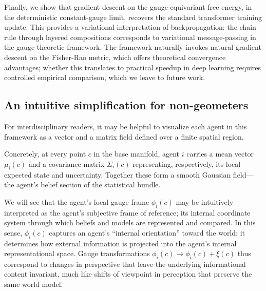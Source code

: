 \documentclass[twoside,11pt]{article}
\begin{document}
Finally, we show that gradient descent on the gauge-equivariant free energy, in the deterministic constant-gauge limit, recovers the standard transformer training update. This provides a variational interpretation of backpropagation: the chain rule through layered compositions corresponds to variational message-passing in the gauge-theoretic framework. The framework naturally invokes natural gradient descent on the Fisher-Rao metric, which offers theoretical convergence advantages; whether this translates to practical speedup in deep learning requires controlled empirical comparison, which we leave to future work.

\subsection{An intuitive simplification for non-geometers}
For interdisciplinary readers, it may be helpful to visualize each agent in this framework as a vector and a matrix field defined over a finite spatial region. 

Concretely, at every point $c$ in the base manifold, agent $i$ carries a mean vector $\mu_i(c)$ and a covariance matrix $\Sigma_i(c)$ representing, respectively, its local expected state and uncertainty. Together these form a smooth Gaussian field—the agent’s belief section of the statistical bundle. 

We will see that the agent's local gauge frame $\phi_i(c)$ may be intuitively interpreted as the agent's subjective frame of reference; its internal coordinate system through which beliefs and models are represented and compared. In this sense, $\phi_i(c)$ captures an agent’s “internal orientation” toward the world: it determines how external information is projected into the agent’s internal representational space. Gauge transformations $\phi_i(c) \to \phi_i(c) + \xi(c)$ thus correspond to changes in perspective that leave the underlying informational content invariant, much like shifts of viewpoint in perception that preserve the same world model. 
\end{document}
